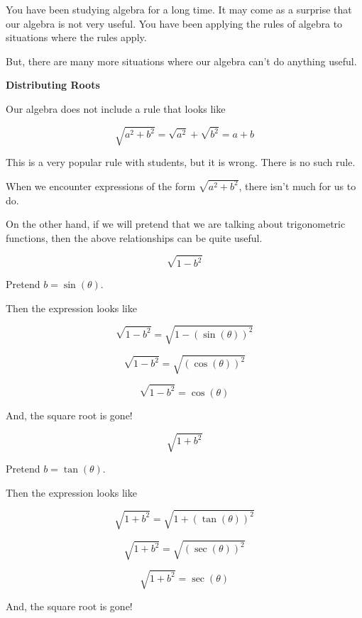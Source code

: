 \documentclass{ximera}
\begin{document}
You have been studying algebra for a long time.  It may come as a surprise that our algebra is not very useful.  You have been applying the rules of algebra to situations where the rules apply. 


But, there are many more situations where our algebra can't do anything useful. 



\textbf{Distributing Roots}


Our algebra does not include a rule that looks like  

\[
\sqrt{a^2 + b^2} = \sqrt{a^2} + \sqrt{b^2} = a + b
\]


This is a very popular rule with students, but it is wrong.  There is no such rule. 


When we encounter expressions of the form $\sqrt{a^2 + b^2}$, there isn't much for us to do. 



On the other hand, if we will pretend that we are talking about trigonometric functions, then the above relationships can be quite useful. 




\begin{example}


\[
\sqrt{1 - b^2} 
\]


Pretend $b = \sin(\theta)$. 

Then the expression looks like

\[
\sqrt{1 - b^2} = \sqrt{1 - (\sin(\theta))^2}
\]


\[
\sqrt{1 - b^2} = \sqrt{(\cos(\theta))^2}
\]


\[
\sqrt{1 - b^2} = \cos(\theta)
\]



And, the square root is gone! 





\end{example}










\begin{example}


\[
\sqrt{1 + b^2} 
\]


Pretend $b = \tan(\theta)$. 

Then the expression looks like

\[
\sqrt{1 + b^2} = \sqrt{1 + (\tan(\theta))^2}
\]


\[
\sqrt{1 + b^2} = \sqrt{(\sec(\theta))^2}
\]


\[
\sqrt{1 + b^2} = \sec(\theta)
\]



And, the square root is gone! 





\end{example}
\end{document}
